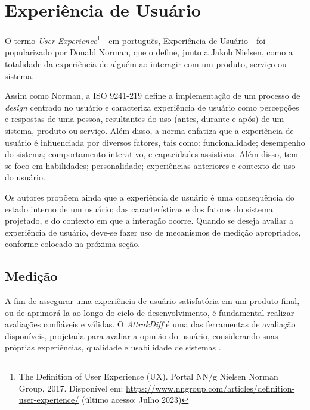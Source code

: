 \section{Experiência de Usuário}
\label{sec:Experiência de Usuário}

O termo \textit{User Experience}\footnote{The Definition of User Experience (UX). Portal NN/g Nielsen Norman Group, 2017. Disponível
em: \url{https://www.nngroup.com/articles/definition-user-experience/} (último acesso: Julho 2023)} - em português, Experiência de Usuário - foi popularizado por Donald Norman, 
que o define, junto a Jakob Nielsen, como a totalidade da experiência de alguém ao interagir com um produto, serviço ou sistema. 

Assim como Norman, a ISO 9241-219 \cite{iso9241210} define a implementação de um processo de \textit{design} centrado no usuário e caracteriza experiência de usuário como percepções e 
respostas de uma pessoa, resultantes do uso (antes, durante e após) de um sistema, produto ou serviço. Além disso, a norma enfatiza que a experiência de usuário 
é influenciada por diversos fatores, tais como: funcionalidade; desempenho do sistema; comportamento interativo, e capacidades assistivas. Além disso, tem-se foco em habilidades; 
personalidade; experiências anteriores e contexto de uso do usuário.

Os autores  propõem ainda que a experiência de usuário é uma consequência do estado interno de um usuário; das características e dos fatores do sistema projetado, 
e do contexto em que a interação ocorre. Quando se deseja avaliar a experiência de usuário, deve-se fazer uso de mecanismos de medição apropriados, conforme colocado na próxima seção.

\subsection{Medição}
\label{sec:Medição2}

A fim de assegurar uma experiência de usuário satisfatória em um produto final, ou de aprimorá-la ao longo do ciclo de desenvolvimento, é fundamental realizar avaliações confiáveis e válidas. 
O \textit{AttrakDiff} é uma das ferramentas de avaliação disponíveis, projetada para avaliar a opinião do usuário, considerando suas próprias experiências, qualidade e usabilidade de sistemas \cite{hassenzahl2003}. 

